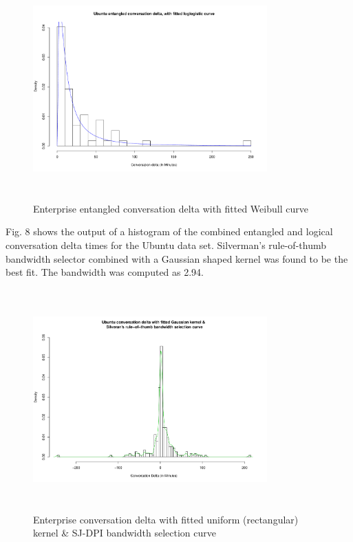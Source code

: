 \documentclass[conference]{IEEEtran}
\begin{document}
\begin{figure}
\begin{center}
\includegraphics[height=8.5cm, width=9cm]{07_delta_entangled_ubuntu.pdf} 
\caption{Enterprise entangled conversation delta with fitted Weibull curve}
\end{center}
\label{fig:delta_ent_ubun}
\end{figure}

Fig. 8 shows the output of a histogram of the combined entangled and logical conversation delta times for the Ubuntu data set. Silverman's rule-of-thumb bandwidth selector combined with a Gaussian shaped kernel was found to be the best fit.  The bandwidth was computed as 2.94.

\begin{figure}
\begin{center}
\includegraphics[height=8.5cm, width=9cm]{08_delta_kde_ubuntu.pdf} 
\caption{Enterprise conversation delta with fitted uniform (rectangular) kernel & \n SJ-DPI bandwidth selection curve}
\end{center}
\label{fig:delta_kde_ubun}
\end{figure}
\end{document}
